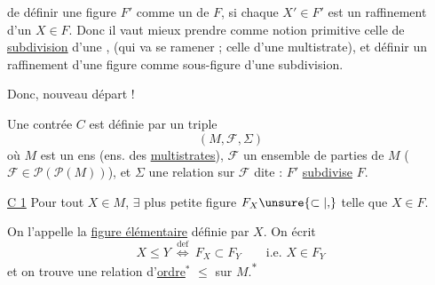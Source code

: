 de définir une figure $F'$ comme un \uline{} de $F$, si chaque $X'\in F'$  est un raffinement d'un $X\in F$. Donc il vaut mieux prendre comme notion primitive celle de \uline{subdivision} d'une  , (qui va se ramener ; celle d'une multistrate), et définir un raffinement d'une figure comme sous-figure d'une subdivision.

Donc, nouveau départ !

Une contrée $C$ est définie par un triple
\[
 (M,\mathcal F,\Sigma)
\]
où $ M$ est un ens (ens. des \uline{multistrates}), $\mathcal F$ un ensemble de parties de $ M$ ($\mathcal F\in\mathcal P(\mathcal P(M))$),  et $\Sigma$ une relation sur $\mathcal F$ dite : $F'$ \uline{subdivise} $F$. 

\uline{C 1} Pour tout $X\in M$, $\exists$  plus petite  figure  $F_X\unsure{\subset|{,}}$ telle que $X\in F$.

On l'appelle la \uline{figure élémentaire} définie par $X$. On écrit
\[
 X\leq Y\ \overset{\mathrm{def}}{\Longleftrightarrow}\ F_X\subset F_Y\qquad\text{i.e. }X\in F_Y
\]
et on trouve une relation d'\uline{ordre}$^{*}$ $\leq$ sur $ M$.\textsuperscript{$*$}
